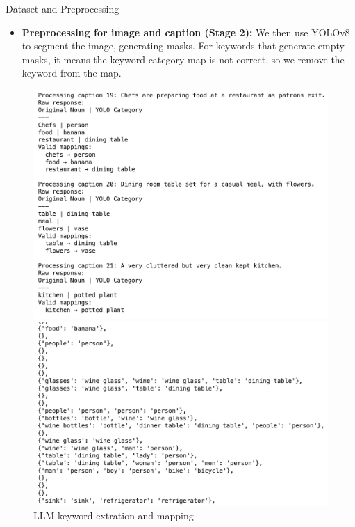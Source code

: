 \documentclass[final]{beamer}
\newlength{\colwidth}
\begin{document}
\begin{frame}[t]
\begin{columns}[t]
\begin{column}{\colwidth}
\begin{block}{Dataset and Preprocessing}
\begin{itemize}
        \textbf{Category Mapping:} Each extracted noun is translated into its corresponding YOLO detection category from the 80 classes defined in YOLOv8, allowing DeClip to leverage pretrained object‑detection priors and attend more to the difference of corresponding regions during training.
         \item \textbf{Preprocessing for image and caption (Stage 2):} We then use YOLOv8 to segment the image, generating masks. For keywords that generate empty masks, it means the keyword-category map is not correct, so we remove the keyword from the map.
  \end{itemize}
  \vspace{1em}
    \begin{figure}[htbp]
  \centering
  \begin{minipage}[t]{0.47\textwidth}
    \centering
    \includegraphics[width=\linewidth]{poster/assets/Screenshot 2025-04-22 at 20.16.18.png} %
    \caption{LLM keyword extration and mapping}
    \label{fig:img1}
  \end{minipage}
  \hfill
  \begin{minipage}[t]{0.5\textwidth}
                \centering
    \includegraphics[width=\linewidth]{poster/assets/Screenshot 2025-04-23 at 07.34.33.png} %

\end{minipage}
\end{figure}
\end{block}
\end{column}
\end{columns}
\end{frame}
\end{document}
